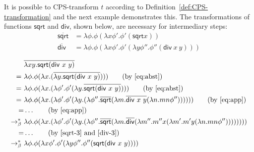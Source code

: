 It is possible to CPS-transform $t$ according to  Definition~\ref{def:CPS-transformation} and the next example demonstrates this. The transformations of functions $\mathsf{sqrt} $ and $\mathsf{div} $, shown below, are necessary for intermediary steps:
%
\begin{subequations}
\begin{align}
\overline{\mathsf{sqrt}} & = \lambda \phi . \phi ( \lambda x \phi'  . \phi'(  \mathsf{sqrt}  x))  \label{sqrt-3} \\
\overline{\mathsf{div}} & = \lambda \phi . \phi  (  \lambda x \phi' . \phi' ( \lambda y \phi''. \phi '' ( \mathsf{div} \ x \ y))) \label{div-3} 
\end{align} \label{eq:sqrtdiv-3}
\end{subequations}

\begin{example}
\begin{small}
\begin{align}
& \overline{\lambda xy. \mathsf{sqrt} (\mathsf{div} \ x \ y)}  \notag \\
= \ & \lambda \phi. \phi ( \lambda x. (\overline{\lambda y. \mathsf{sqrt} (\mathsf{div} \ x \ y)}  ))) \tag{by~\eqref{eq:abst}} \\
= \ & \lambda \phi. \phi ( \lambda x. ( \lambda \phi'. \phi' ( \lambda y. \overline{ \mathsf{sqrt} (\mathsf{div} \ x \ y)}  ))) \tag{by~\eqref{eq:abst}} \\
= \ & \lambda \phi. \phi ( \lambda x. ( \lambda \phi'. \phi' ( \lambda y. ( \lambda \phi''. \overline{ \mathsf{sqrt}} ( \lambda m. \overline{\mathsf{div} \ x \ y}  (\lambda n. mn \phi'')  ))) ))\tag{by~\eqref{eq:app}} \\
 = & \dots  \tag{by~\eqref{eq:app}} \\
 \bred \ &  \lambda \phi. \phi ( \lambda x. ( \lambda \phi'. \phi' ( \lambda y. ( \lambda \phi''. \overline{\mathsf{sqrt}}(\lambda m. \overline{\mathsf{div}}  (\lambda m''. m'' x ( \lambda m'. m' y (\lambda n. mn \phi ''))) ) )) ) ) \label{eq:exdivbyzero0}\\
= & \dots \tag{by~\eqref{sqrt-3} and~\eqref{div-3}} \\
 \bred \ &  \lambda \phi. \phi ( \lambda x \phi'. \phi' ( \lambda y \phi ''. \phi''  (\mathsf{sqrt} ( \mathsf{div} \ x\ y ))))\label{eq:exdivbyzero} 
\end{align}
\end{small}
\end{example}

